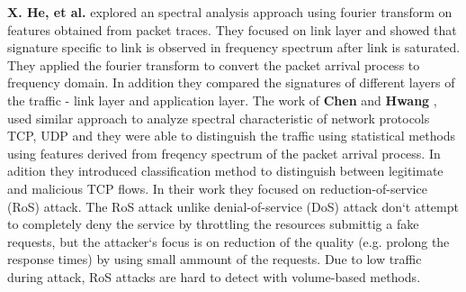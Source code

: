 \textbf{X. He, et al.} \cite{he2004spectral} explored an spectral analysis approach using fourier transform on features obtained from packet traces. 
They focused on link layer and showed that signature specific to link
is observed in frequency spectrum after link is saturated. They applied the fourier
transform  to convert the packet arrival process to frequency domain. 
In addition they compared the signatures of different layers of the traffic - link layer 
and application layer.  %
%
The work of \textbf{Chen} and \textbf{Hwang} \cite{chen2007tcp}, \cite{chen2007spectral} used similar approach to analyze spectral 
characteristic of network protocols TCP, UDP and they 
were able to distinguish the traffic using statistical methods using features derived
from freqency spectrum of the packet arrival process.
In adition they introduced classification method to distinguish between 
legitimate  and malicious TCP flows. 
In %
their work they focused on reduction-of-service (RoS) attack.
The RoS attack unlike denial-of-service (DoS) attack don`t attempt to completely deny the
service by throttling the resources submittig a fake requests, but the attacker`s focus is on reduction of the quality (e.g. prolong the response times) 
by using small ammount of the requests. 
Due to low traffic during attack, RoS attacks are hard to detect with volume-based methods.
%

